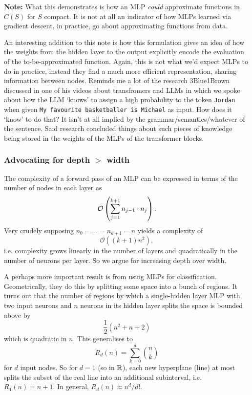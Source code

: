 \documentclass[11pt]{article}
\begin{document}
\vspace{10pt}
\noindent\textbf{Note:} What this demonstrates is how an MLP \textit{could} approximate functions in $C(S)$ for $S$ compact. It is not at all an indicator of how MLPs learned via gradient descent, in practice, go about approximating functions from data.

An interesting addition to this note is how this formulation gives an idea of how the weights from the hidden layer to the output explicitly encode the evaluation of the to-be-approximated function. Again, this is not what we'd expect MLPs to do in practice, instead they find a much more efficient representation, sharing information between nodes. Reminds me a lot of the research 3Blue1Brown discussed in one of his videos about transfromers and LLMs in which we spoke about how the LLM `knows' to assign a high probability to the token \texttt{Jordan} when given \texttt{My favourite basketballer is Michael} as input. How does it `know' to do that? It isn't at all implied by the grammar/semantics/whatever of the sentence. Said research concluded things about such pieces of knowledge being stored in the weights of the MLPs of the transformer blocks.

\subsubsection{Advocating for depth $>$ width}
\label{subsubsec:deep_MLPs}
The complexity of a forward pass of an MLP can be expressed in terms of the number of nodes in each layer as
$$
\mathcal{O}
\left(
\sum_{j=1}^{k+1}n_{j-1}\cdot n_j
\right).
$$
Very crudely supposing $n_0=\dots=n_{k+1}=n$ yields a complexity of
$$
\mathcal{O}((k+1)n^2),
$$
i.e. complexity grows linearly in the number of layers and quadratically in the number of neurons per layer. So we argue for increasing depth over width.

A perhaps more important result is from using MLPs for classification. Geometrically, they do this by splitting some space into a bunch of regions. It turns out that the number of regions by which a single-hidden layer MLP with two input neurons and $n$ neurons in its hidden layer splits the space is bounded above by
$$
\frac{1}{2}(n^2+n+2)
$$
which is quadratic in $n$. This generalises to
$$
R_d(n)
=
\sum_{k=0}^d\binom{n}{k}
$$
for $d$ input nodes. So for $d=1$ (so in $\mathbb{R}$), each new hyperplane (line) at most splits the subset of the real line into an additional subinterval, i.e. $R_1(n)=n+1$. In general, $R_d(n)\approx n^d/d!$.
\end{document}
